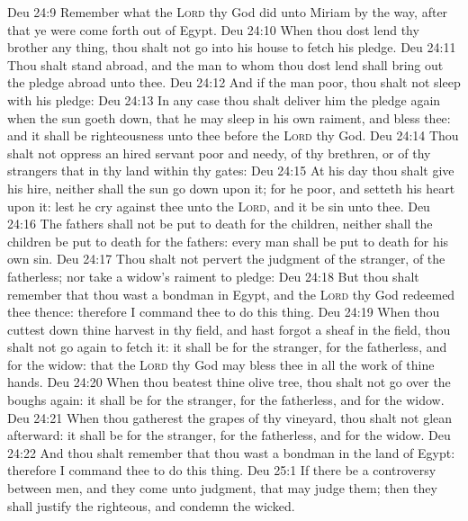 \vs Deu 24:9 Remember what the \textsc{Lord} thy God did unto Miriam by the way, after that ye were come forth out of Egypt.
\vs Deu 24:10 When thou dost lend thy brother any thing, thou shalt not go into his house to fetch his pledge.
\vs Deu 24:11 Thou shalt stand abroad, and the man to whom thou dost lend shall bring out the pledge abroad unto thee.
\vs Deu 24:12 And if the man  poor, thou shalt not sleep with his pledge:
\vs Deu 24:13 In any case thou shalt deliver him the pledge again when the sun goeth down, that he may sleep in his own raiment, and bless thee: and it shall be righteousness unto thee before the \textsc{Lord} thy God.
\vs Deu 24:14 Thou shalt not oppress an hired servant  poor and needy,  of thy brethren, or of thy strangers that  in thy land within thy gates:
\vs Deu 24:15 At his day thou shalt give  his hire, neither shall the sun go down upon it; for he  poor, and setteth his heart upon it: lest he cry against thee unto the \textsc{Lord}, and it be sin unto thee.
\vs Deu 24:16 The fathers shall not be put to death for the children, neither shall the children be put to death for the fathers: every man shall be put to death for his own sin.
\vs Deu 24:17 Thou shalt not pervert the judgment of the stranger,  of the fatherless; nor take a widow's raiment to pledge:
\vs Deu 24:18 But thou shalt remember that thou wast a bondman in Egypt, and the \textsc{Lord} thy God redeemed thee thence: therefore I command thee to do this thing.
\vs Deu 24:19 When thou cuttest down thine harvest in thy field, and hast forgot a sheaf in the field, thou shalt not go again to fetch it: it shall be for the stranger, for the fatherless, and for the widow: that the \textsc{Lord} thy God may bless thee in all the work of thine hands.
\vs Deu 24:20 When thou beatest thine olive tree, thou shalt not go over the boughs again: it shall be for the stranger, for the fatherless, and for the widow.
\vs Deu 24:21 When thou gatherest the grapes of thy vineyard, thou shalt not glean  afterward: it shall be for the stranger, for the fatherless, and for the widow.
\vs Deu 24:22 And thou shalt remember that thou wast a bondman in the land of Egypt: therefore I command thee to do this thing.
\vs Deu 25:1 If there be a controversy between men, and they come unto judgment, that  may judge them; then they shall justify the righteous, and condemn the wicked.
